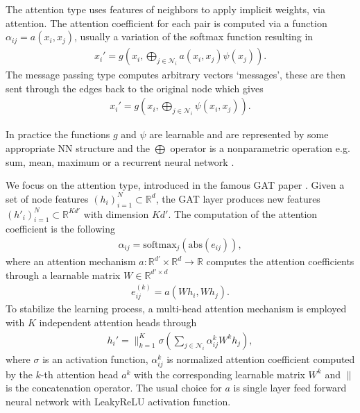 The attention type \cite{gan_velickovic} uses features of neighbors to apply
implicit weights, via attention. The attention coefficient for each pair is
computed via a function $\alpha_{ij} = a(x_i, x_j)$, usually a variation of
the softmax function resulting in
\begin{align}
    x_i' = g\left( x_i, \bigoplus_{j\in \mathcal{N}_i} a(x_i, x_j) \psi(x_j) \right).
\end{align}
The message passing type \cite[Chapter~5]{gnn_overview} computes arbitrary
vectors `messages', these are then sent through the edges back to the
original node which gives
\begin{align}
    x_i' = g\left( x_i, \bigoplus_{j\in \mathcal{N}_i} \psi(x_i, x_j) \right).
\end{align}

In practice the functions $g$ and $\psi$ are learnable and are represented by
some appropriate NN structure and the $\bigoplus$ operator is a nonparametric
operation e.g. sum, mean, maximum or a recurrent neural network
\cite[Chapter~5]{gnn_overview}.
\newline

We focus on the attention type, introduced in the famous GAT paper
\cite{gan_velickovic}. Given a set of node features $(h_i)_{i=1}^{N}\subset
\mathbb{R}^{d}$, the GAT layer produces new features $(h'_i)_{i=1}^{N}
\subset \mathbb{R}^{Kd'}$ with dimension $Kd'$. The computation of the
attention coefficient is the following
\begin{align}
    \alpha_{ij} =
    \text{softmax}_j\left(\text{abs}(e_{ij})\right),
\end{align}
where an attention mechanism $a: \mathbb{R}^{d'}\times\mathbb{R}^{d}\to
\mathbb{R}$ computes the attention coefficients through a learnable
matrix $W\in \mathbb{R}^{d'\times d}$
\begin{align}
    e_{ij}^{(k)} = a(Wh_i, Wh_j).
\end{align}
To stabilize the learning process, a multi-head attention mechanism is
employed with $K$ independent attention heads through
\begin{align}
    h_i' = \|_{k=1}^{K} \sigma\left(
        \sum_{j\in\mathcal{N}_i}\alpha_{ij}^{k} W^{k} h_j
    \right),
\end{align}
where $\sigma$ is an activation function, $\alpha_{ij}^{k}$ is normalized
attention coefficient computed by the $k$-th attention head $a^{k}$ with the
corresponding learnable matrix $W^{k}$ and $\|$ is the concatenation
operator. The usual choice for $a$ is single layer feed forward neural
network with LeakyReLU activation function.
